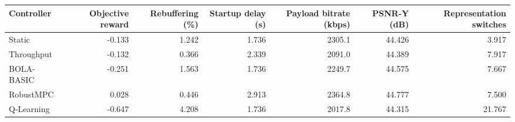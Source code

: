 \begin{tabular}{lrrrrrr}
\toprule
Controller & Objective reward & Rebuffering (\%) & Startup delay (s) & Payload bitrate (kbps) & PSNR-Y (dB) & Representation switches \\
\midrule
Static & -0.133 & 1.242 & 1.736 & 2305.1 & 44.426 & 3.917 \\
Throughput & -0.132 & 0.366 & 2.339 & 2091.0 & 44.389 & 7.917 \\
BOLA-BASIC & -0.251 & 1.563 & 1.736 & 2249.7 & 44.575 & 7.667 \\
RobustMPC & 0.028 & 0.446 & 2.913 & 2364.8 & 44.777 & 7.500 \\
Q-Learning & -0.647 & 4.208 & 1.736 & 2017.8 & 44.315 & 21.767 \\
\bottomrule
\end{tabular}
